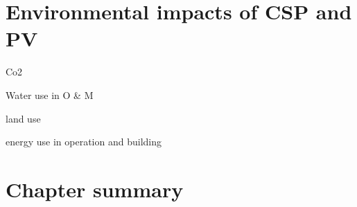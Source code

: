 \section{Environmental impacts of CSP and PV}
Co2

Water use in O \& M

land use

energy use in operation and building
\cite{EASAC2011}

\cite{Caldes2012} 

\section{Chapter summary}

